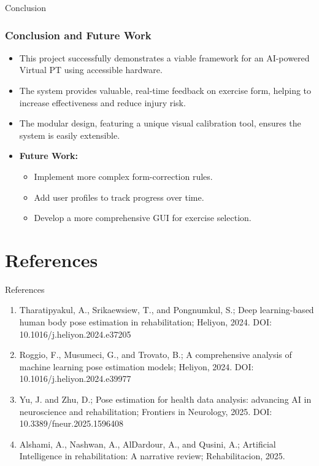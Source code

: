 \documentclass[10pt]{beamer}
\begin{document}
\begin{frame}{Conclusion}
    \frametitle{Conclusion and Future Work}
    \begin{itemize}
        \item This project successfully demonstrates a viable framework for an AI-powered Virtual PT using accessible hardware.\vspace{0.5em}
        \item The system provides valuable, real-time feedback on exercise form, helping to increase effectiveness and reduce injury risk.\vspace{0.5em}
        \item The modular design, featuring a unique visual calibration tool, ensures the system is easily extensible.\vspace{0.5em}
        \item \textbf{Future Work:}
        \begin{itemize}
            \item Implement more complex form-correction rules.
            \item Add user profiles to track progress over time.
            \item Develop a more comprehensive GUI for exercise selection.
        \end{itemize}
    \end{itemize}
\end{frame}


\section{References}
\begin{frame}{References}
\footnotesize
\begin{enumerate}
\item Tharatipyakul, A., Srikaewsiew, T., and Pongnumkul, S.; Deep learning-based human body pose estimation in rehabilitation; Heliyon, 2024. DOI: 10.1016/j.heliyon.2024.e37205

\item Roggio, F., Musumeci, G., and Trovato, B.; A comprehensive analysis of machine learning pose estimation models; Heliyon, 2024. DOI: 10.1016/j.heliyon.2024.e39977

\item Yu, J. and Zhu, D.; Pose estimation for health data analysis: advancing AI in neuroscience and rehabilitation; Frontiers in Neurology, 2025. DOI: 10.3389/fneur.2025.1596408

\item Alshami, A., Nashwan, A., AlDardour, A., and Qusini, A.; Artificial Intelligence in rehabilitation: A narrative review; Rehabilitacion, 2025.
\end{enumerate}
\end{frame}
\end{document}
